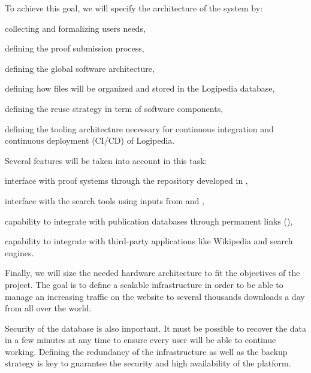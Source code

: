 \begin{workpackage}[id=access,type=RTD,wphases=1-48,
  short=Access,%
  title={Access},
  lead=Inr,InrRM=48,OcaRM=6,EduRM=12]
\begin{tasklist}
\begin{task}[id=archi,
      title=Setting up the hardware and software architecture,
      shorttitle=Setting up the hardware and software architecture,
      lead=Inr,InrRM=6,wphases=1-6]
    To achieve this goal, we will specify the architecture of the system by:
    \begin{compactitem}
    \item collecting and formalizing users needs,
    \item defining the proof submission process,
    \item defining the global software architecture,
    \item defining how files will be organized and stored in the
      Logipedia database,
    \item defining the reuse strategy in term of software components,
    \item defining the tooling architecture necessary for continuous
      integration and continuous deployment (CI/CD) of Logipedia.
    \end{compactitem}

    Several features will be taken into account in this task:
    \begin{compactitem}
    \item interface with proof systems through the repository developed
      in ,
    \item interface with the search tools using inputs from
       and ,
    \item capability to integrate with publication databases through
      permanent links (),
    \item capability to integrate with third-party applications like
      Wikipedia and search engines.
    \end{compactitem}

    Finally, we will size the needed hardware architecture to fit the
    objectives of the project. The goal is to define a scalable
    infrastructure in order to be able to manage an increasing traffic
    on the website to several thousands downloads a day from all over
    the world.

    Security of the database is also important. It must be possible to
    recover the data in a few minutes at any time to ensure every user
    will be able to continue working. Defining the redundancy of the
    infrastructure as well as the backup strategy is key to guarantee
    the security and high availability of the platform.


\end{task}
\end{tasklist}
\end{workpackage}
